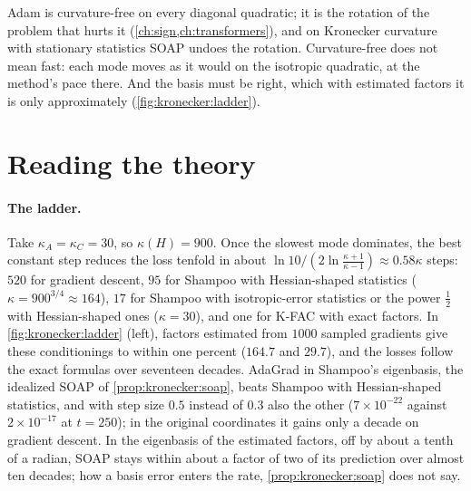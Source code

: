 \begin{refsection}
Adam is curvature-free on every diagonal quadratic; it is the rotation of the problem that hurts it (\cref{ch:sign,ch:transformers}), and on Kronecker curvature with stationary statistics SOAP undoes the rotation. Curvature-free does not mean fast: each mode moves as it would on the isotropic quadratic, at the method's pace there. And the basis must be right, which with estimated factors it is only approximately (\cref{fig:kronecker:ladder}).

\section{Reading the theory}\label{sec:kronecker:reading}

\paragraph{The ladder.} Take $\kappa_A=\kappa_C=30$, so $\kappa(H)=900$. Once the slowest mode dominates, the best constant step reduces the loss tenfold in about $\ln10/(2\ln\frac{\kappa+1}{\kappa-1})\approx0.58\kappa$ steps: $520$ for gradient descent, $95$ for Shampoo with Hessian-shaped statistics ($\kappa=900^{3/4}\approx164$), $17$ for Shampoo with isotropic-error statistics or the power $\frac12$ with Hessian-shaped ones ($\kappa=30$), and one for K-FAC with exact factors. In \cref{fig:kronecker:ladder} (left), factors estimated from $1000$ sampled gradients give these conditionings to within one percent ($164.7$ and $29.7$), and the losses follow the exact formulas over seventeen decades. AdaGrad in Shampoo's eigenbasis, the idealized SOAP of \cref{prop:kronecker:soap}, beats Shampoo with Hessian-shaped statistics, and with step size $0.5$ instead of $0.3$ also the other ($7\times10^{-22}$ against $2\times10^{-17}$ at $t=250$); in the original coordinates it gains only a decade on gradient descent. In the eigenbasis of the estimated factors, off by about a tenth of a radian, SOAP stays within about a factor of two of its prediction over almost ten decades; how a basis error enters the rate, \cref{prop:kronecker:soap} does not say.


\end{refsection}
